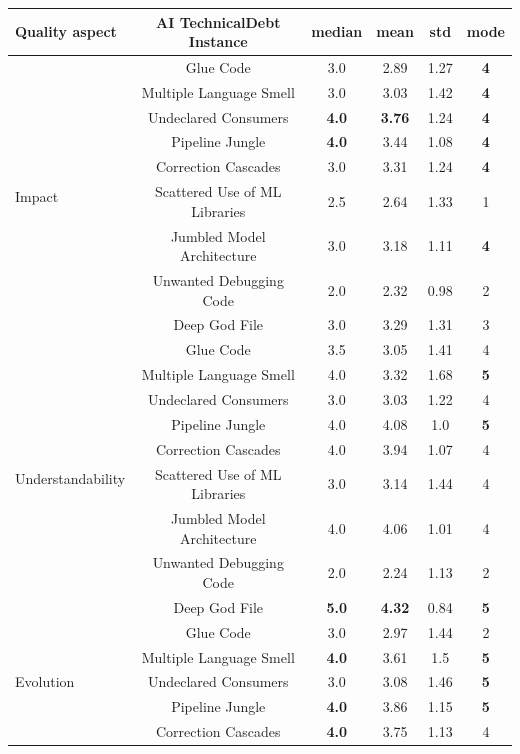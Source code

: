 \begin{table}[h!]
    \footnotesize
    \centering
    \begin{tabular}{|l|c|c|c|c|c|}
    \hline
    Quality aspect & AI TechnicalDebt Instance & median & mean & std & mode \\
    \hline
\multirow{9}{*}{Impact}
& Glue Code & 3.0 & 2.89 & 1.27 & \textbf{4}   \\
& Multiple Language Smell & 3.0 & 3.03 & 1.42 & \textbf{4}   \\
& Undeclared Consumers & \textbf{4.0} & \textbf{3.76} & 1.24 & \textbf{4}   \\
& Pipeline Jungle & \textbf{4.0} & 3.44 & 1.08 &\textbf{4}   \\
& Correction Cascades & 3.0 & 3.31 & 1.24 & \textbf{4}   \\
& Scattered Use of ML Libraries & 2.5 & 2.64 & 1.33 & 1   \\
& Jumbled Model Architecture & 3.0 & 3.18 & 1.11 & \textbf{4}   \\
& Unwanted Debugging Code & 2.0 & 2.32 & 0.98 & 2   \\
& Deep God File & 3.0 & 3.29 & 1.31 & 3   \\
    \hline
\multirow{9}{*}{Understandability}
& Glue Code & 3.5 & 3.05 & 1.41 & 4  \\
& Multiple Language Smell & 4.0 & 3.32 & 1.68 & \textbf{5}  \\
& Undeclared Consumers & 3.0 & 3.03 & 1.22 & 4  \\
& Pipeline Jungle & 4.0 & 4.08 & 1.0 & \textbf{5}  \\
& Correction Cascades & 4.0 & 3.94 & 1.07 & 4  \\
& Scattered Use of ML Libraries & 3.0 & 3.14 & 1.44 & 4  \\
& Jumbled Model Architecture & 4.0 & 4.06 & 1.01 & 4  \\
& Unwanted Debugging Code & 2.0 & 2.24 & 1.13 & 2  \\
& Deep God File & \textbf{5.0} & \textbf{4.32} & 0.84 & \textbf{5}  \\
    \hline
\multirow{9}{*}{Evolution}
& Glue Code & 3.0 & 2.97 & 1.44 & 2 \\
& Multiple Language Smell & \textbf{4.0} & 3.61 & 1.5 & \textbf{5}  \\
& Undeclared Consumers & 3.0 & 3.08 & 1.46 & \textbf{5}  \\
& Pipeline Jungle & \textbf{4.0} & 3.86 & 1.15 & \textbf{5}  \\
& Correction Cascades & \textbf{4.0} & 3.75 & 1.13 & 4  \\

\end{tabular}
\end{table}
